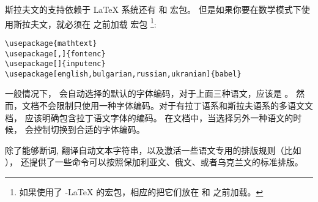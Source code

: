 斯拉夫文的支持依赖于 \LaTeX{} 系统还有  和  宏包。
但是如果你要在数学模式下使用斯拉夫文，就必须在  之前加载  宏包
\footnote{如果使用了 \AmS-\LaTeX{} 的宏包，相应的把它们放在  和  之前加载。}:
\begin{lscommand}
\verb+\usepackage{mathtext}+\\
\verb+\usepackage[+\verb+,+\verb+]{fontenc}+\\
\verb+\usepackage[+\verb+]{inputenc}+\\
\verb+\usepackage[english,bulgarian,russian,ukranian]{babel}+
\end{lscommand}

一般情况下， 会自动选择的默认的字体编码，对于上面三种语文，应该是 。
然而，文档不会限制只使用一种字体编码。对于有拉丁语系和斯拉夫语系的多语文文档，
应该明确包含拉丁语文字体的编码。
在文档中，当选择另外一种语文的时候， 会控制切换到合适的字体编码。

除了能够断词,
翻译自动文本字符串，以及激活一些语文专用的排版规则（比如 ），
 还提供了一些命令可以按照保加利亚文、俄文、或者乌克兰文的标准排版。



